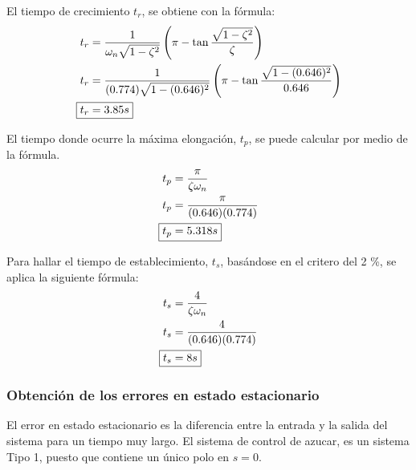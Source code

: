 \documentclass[journal]{IEEEtran}
\begin{document}
El tiempo de crecimiento $t_r$, se obtiene con la 
f\'ormula:
\begin{align*}
	t_r & = \frac{1}{\omega_n \sqrt{1 - \zeta^2}}\left(
	\pi - \tan \frac{\sqrt{1 - \zeta^2 }}{\zeta}\right)\\
	t_r & = \frac{1}{(0.774)\sqrt{1 - (0.646)^2}}\left(
	\pi - \tan \frac{\sqrt{1 - (0.646)^2 }}{0.646}\right)\\
	\Aboxed{ t_r & = 3.85 s } 
\end{align*}

El tiempo donde ocurre la m\'axima elongaci\'on, $t_p$, 
se puede calcular por medio de la f\'ormula. 
\begin{align*}
	t_p & = \frac{\pi}{\zeta \omega_n}  \\ 
	t_p & = \frac{\pi}{(0.646)(0.774)} \\
	\Aboxed{ t_p & = 5.318 s}  
\end{align*}

Para hallar el tiempo de establecimiento, $t_s$, bas\'andose
en el critero del 2 \%, se aplica la siguiente f\'ormula: 
\begin{align*}
	t_s & = \frac{4}{\zeta \omega_n} \\ 
	t_s & = \frac{4}{(0.646)(0.774)} \\
	\Aboxed{ t_s & = 8 s} \\
\end{align*}

\subsubsection*{Obtenci\'on de los errores en estado 
estacionario}
El error en estado estacionario es la diferencia entre la 
entrada y la salida del sistema para un tiempo muy largo. 
El sistema de control de azucar, es un sistema Tipo 1,
puesto que contiene un \'unico polo en $s = 0$. \\
%

\end{document}
